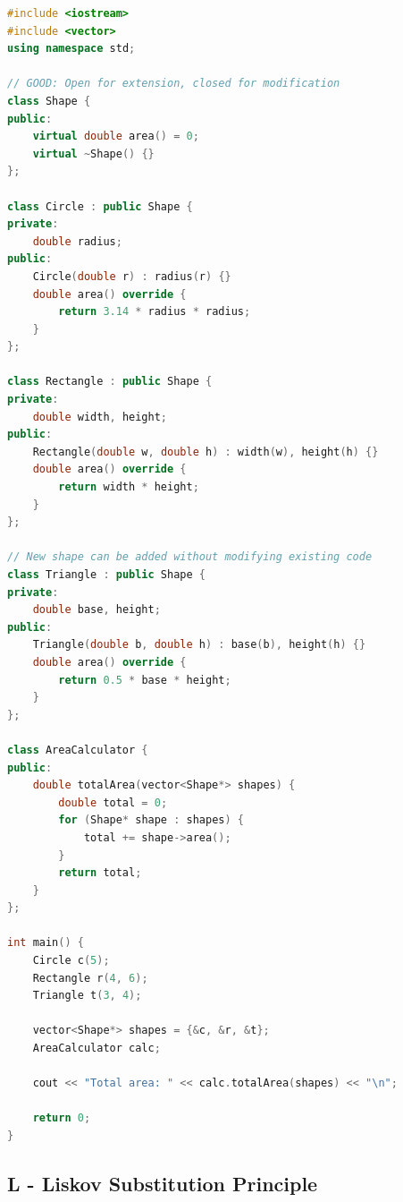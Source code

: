 \begin{lstlisting}[language={C++}]
#include <iostream>
#include <vector>
using namespace std;

// GOOD: Open for extension, closed for modification
class Shape {
public:
    virtual double area() = 0;
    virtual ~Shape() {}
};

class Circle : public Shape {
private:
    double radius;
public:
    Circle(double r) : radius(r) {}
    double area() override {
        return 3.14 * radius * radius;
    }
};

class Rectangle : public Shape {
private:
    double width, height;
public:
    Rectangle(double w, double h) : width(w), height(h) {}
    double area() override {
        return width * height;
    }
};

// New shape can be added without modifying existing code
class Triangle : public Shape {
private:
    double base, height;
public:
    Triangle(double b, double h) : base(b), height(h) {}
    double area() override {
        return 0.5 * base * height;
    }
};

class AreaCalculator {
public:
    double totalArea(vector<Shape*> shapes) {
        double total = 0;
        for (Shape* shape : shapes) {
            total += shape->area();
        }
        return total;
    }
};

int main() {
    Circle c(5);
    Rectangle r(4, 6);
    Triangle t(3, 4);
    
    vector<Shape*> shapes = {&c, &r, &t};
    AreaCalculator calc;
    
    cout << "Total area: " << calc.totalArea(shapes) << "\n";
    
    return 0;
}
\end{lstlisting}

\hypertarget{l---liskov-substitution-principle}{%
\subsection{L - Liskov Substitution
Principle}\label{l---liskov-substitution-principle}}

